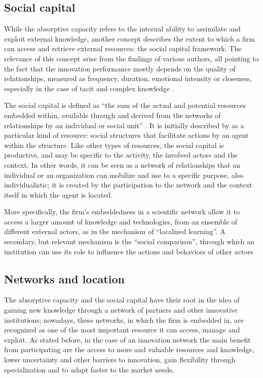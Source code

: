 \subsection{Social capital}

While the absorptive capacity refers to the internal ability to assimilate and exploit external knowledge, another concept describes the extent to which a firm can access and retrieve external resources: the social capital framework. The relevance of this concept arise from the findings of various authors, all pointing to the fact that the innovation performance mostly depends on the quality of relationships, measured as frequency, duration, emotional intensity or closeness, especially in the case of tacit and complex knowledge \citep{Perez-Luno2011}. 

The social capital is defined as \enquote{the sum of the actual and potential resources embedded within, available through and derived from the networks of relationships by an individual or social unit} \citep{Perez-Luno2011}. It is initially described by \citet{Coleman1988} as a particular kind of resource: social structures that facilitate actions by an agent within the structure. Like other types of resources, the social capital is productive, and may be specific to the activity, the involved actors and the context. In other words, it can be seen as a network of relationships that an individual or an organization can mobilize and use to a specific purpose, also individualistic; it is created by the participation to the network and the context itself in which the agent is located.

More specifically, the firm's embeddedness in a scientific network allow it to access a larger amount of knowledge and technologies, from an ensemble of different external actors, as in the mechanism of \enquote{localized learning}. A secondary, but relevant mechanism is the \enquote{social comparison}, through which an institution can use its role to influence the actions and behaviors of other actors \citep{Slavova2015}

\subsection{Networks and location}
The absorptive capacity and the social capital have their root in the idea of gaining new knowledge through a network of partners and other innovative institutions; nowadays, these networks, in which the firm is embedded in, are recognized as one of the most important resource it can access, manage and exploit. As stated before, in the case of an innovation network the main benefit from participating are the access to more and valuable resources and knowledge, lower uncertainty and other barriers to innovation, gain flexibility through specialization and to adapt faster to the market needs. 

